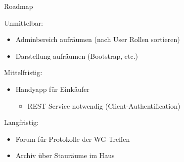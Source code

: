 \begin{frame}{Roadmap}

Unmittelbar:
\begin{itemize}
\item Adminbereich aufräumen (nach User Rollen sortieren)
\item Darstellung aufräumen (Bootstrap, etc.)
\end{itemize}

Mittelfristig:
\begin{itemize}
\item Handyapp für Einkäufer
\begin{itemize}
\item REST Service notwendig (Client-Authentification)
\end{itemize}
\end{itemize}

Langfristig:
\begin{itemize}
\item Forum für Protokolle der WG-Treffen
\item Archiv über Stauräume im Haus
\end{itemize}

\end{frame}
